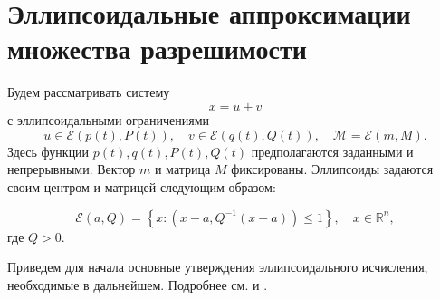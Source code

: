 \section{Эллипсоидальные аппроксимации множества разрешимости}
Будем рассматривать систему
\begin{equation*}
    \dot{x} = u + v
\end{equation*}
с эллипсоидальными ограничениями
\begin{equation*}
    u \in \mathcal{E}(p(t), P(t)), \quad v \in \mathcal{E}(q(t), Q(t)), \quad \mathcal{M} = 
     \mathcal{E}(m, M).
\end{equation*}
Здесь функции \( p(t), q(t), P(t), Q(t) \) предполагаются заданными и непрерывными. Вектор \( m \) и
 матрица \( M \) фиксированы. Эллипсоиды задаются своим центром и матрицей следующим образом:
 
\begin{equation*}
    \mathcal{E}(a, Q) = \left\{ x : (x - a, Q^{-1}(x - a)) \le 1 \right\}, \quad x \in \mathbb{R}^n,
\end{equation*}
где \( Q > 0 \).

Приведем для начала основные утверждения эллипсоидального исчисления, необходимые в дальнейшем. Подробнее 
см. \cite{ellips_calculus} и \cite{reach_an_unc_sys}.

